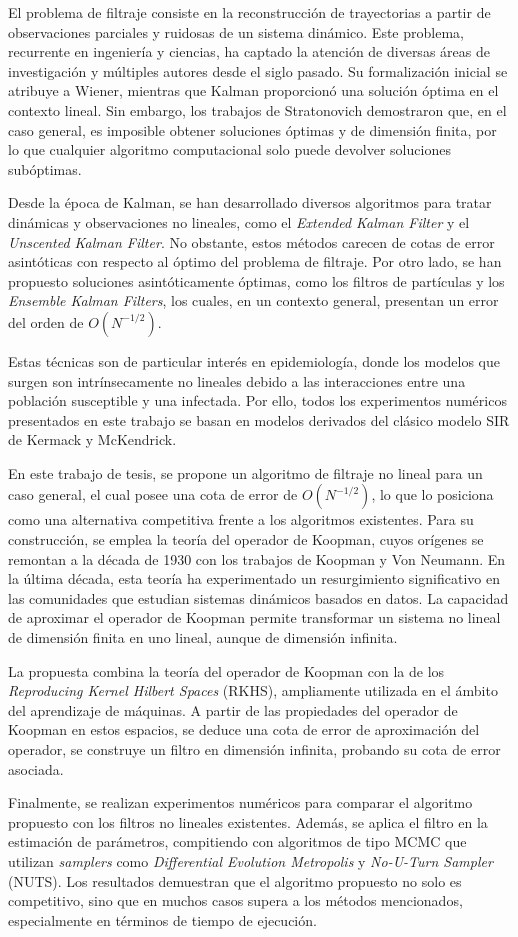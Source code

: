 El problema de filtraje consiste en la reconstrucción de trayectorias a partir de observaciones parciales y ruidosas de un sistema dinámico. Este problema, recurrente en ingeniería y ciencias, ha captado la atención de diversas áreas de investigación y múltiples autores desde el siglo pasado. Su formalización inicial se atribuye a Wiener, mientras que Kalman proporcionó una solución óptima en el contexto lineal. Sin embargo, los trabajos de Stratonovich demostraron que, en el caso general, es imposible obtener soluciones óptimas y de dimensión finita, por lo que cualquier algoritmo computacional solo puede devolver soluciones subóptimas.

Desde la época de Kalman, se han desarrollado diversos algoritmos para tratar dinámicas y observaciones no lineales, como el \textit{Extended Kalman Filter} y el \textit{Unscented Kalman Filter}. No obstante, estos métodos carecen de cotas de error asintóticas con respecto al óptimo del problema de filtraje. Por otro lado, se han propuesto soluciones asintóticamente óptimas, como los filtros de partículas y los \textit{Ensemble Kalman Filters}, los cuales, en un contexto general, presentan un error del orden de \( O(N^{-1/2}) \).

Estas técnicas son de particular interés en epidemiología, donde los modelos que surgen son intrínsecamente no lineales debido a las interacciones entre una población susceptible y una infectada. Por ello, todos los experimentos numéricos presentados en este trabajo se basan en modelos derivados del clásico modelo SIR de Kermack y McKendrick.

En este trabajo de tesis, se propone un algoritmo de filtraje no lineal para un caso general, el cual posee una cota de error de \( O(N^{-1/2}) \), lo que lo posiciona como una alternativa competitiva frente a los algoritmos existentes. Para su construcción, se emplea la teoría del operador de Koopman, cuyos orígenes se remontan a la década de 1930 con los trabajos de Koopman y Von Neumann. En la última década, esta teoría ha experimentado un resurgimiento significativo en las comunidades que estudian sistemas dinámicos basados en datos. La capacidad de aproximar el operador de Koopman permite transformar un sistema no lineal de dimensión finita en uno lineal, aunque de dimensión infinita.

La propuesta combina la teoría del operador de Koopman con la de los \textit{Reproducing Kernel Hilbert Spaces} (RKHS), ampliamente utilizada en el ámbito del aprendizaje de máquinas. A partir de las propiedades del operador de Koopman en estos espacios, se deduce una cota de error de aproximación del operador, se construye un filtro en dimensión infinita, probando su cota de error asociada.

Finalmente, se realizan experimentos numéricos para comparar el algoritmo propuesto con los filtros no lineales existentes. Además, se aplica el filtro en la estimación de parámetros, compitiendo con algoritmos de tipo MCMC que utilizan \textit{samplers} como \textit{Differential Evolution Metropolis} y \textit{No-U-Turn Sampler} (NUTS). Los resultados demuestran que el algoritmo propuesto no solo es competitivo, sino que en muchos casos supera a los métodos mencionados, especialmente en términos de tiempo de ejecución.
